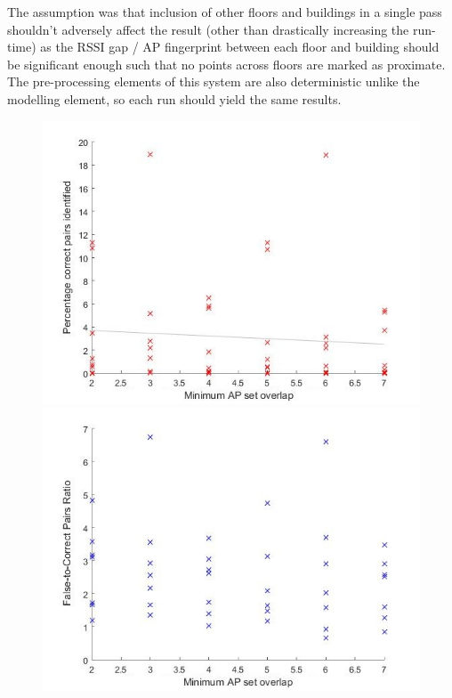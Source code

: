 \documentclass{UoYCSproject}
\begin{document}
                The assumption was that inclusion of other floors and buildings in a single pass shouldn't adversely affect the result (other than drastically increasing the run-time) as the RSSI gap / AP fingerprint between each floor and building should be significant enough such that no points across floors are marked as proximate. The pre-processing elements of this system are also deterministic unlike the modelling element, so each run should yield the same results.
                
                \begin{figure}[h]
                	\label{fig:ez_overlap_prox}
                	\centering
                	\begin{minipage}{0.5\textwidth}
                		\centering
                		\includegraphics[width=1\textwidth]{ez_overlap_prox_correct.jpg}
                	\end{minipage}\hfill
                	\begin{minipage}{0.5\textwidth}
                		\centering
                		\includegraphics[width=1\textwidth]{ez_overlap_prox_false.jpg}

\end{minipage}
\end{figure}
\end{document}
